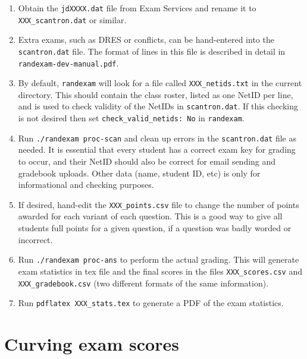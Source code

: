 \documentclass{article}
\begin{document}
\begin{enumerate}
\item Obtain the \texttt{jdXXXX.dat} file from Exam Services and
  rename it to \texttt{XXX_scantron.dat} or similar.
\item Extra exams, such as DRES or conflicts, can be hand-entered into
  the \texttt{scantron.dat} file. The format of lines in this file is
  described in detail in \texttt{randexam-dev-manual.pdf}.
\item By default, \texttt{randexam} will look for a file called
  \texttt{XXX_netids.txt} in the current directory. This should
  contain the class roster, listed as one NetID per line, and is used
  to check validity of the NetIDs in \texttt{scantron.dat}. If this
  checking is not desired then set \texttt{check_valid_netids: No}
  in \texttt{randexam}.
\item Run \texttt{./randexam proc-scan} and clean up errors in the
  \texttt{scantron.dat} file as needed. It is essential that every
  student has a correct exam key for grading to occur, and their NetID
  should also be correct for email sending and gradebook
  uploads. Other data (name, student ID, etc) is only for
  informational and checking purposes.
\item If desired, hand-edit the \texttt{XXX_points.csv} file to change the
  number of points awarded for each variant of each question. This is
  a good way to give all students full points for a given question, if
  a question was badly worded or incorrect.
\item Run \texttt{./randexam proc-ans} to perform the actual
  grading. This will generate exam statistics in tex file and the
  final scores in the files \texttt{XXX_scores.csv} and
  \texttt{XXX_gradebook.csv} (two different formats of the same
  information).
\item Run \texttt{pdflatex XXX_stats.tex} to generate a PDF of the
  exam statistics.
\end{enumerate}

\section{Curving exam scores}
\end{document}
